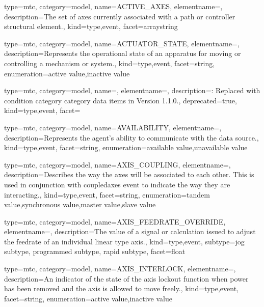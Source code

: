 {
  type=mtc,
  category=model,
  name={ACTIVE\_AXES},
  elementname=,
  description={The set of axes currently associated with a \gls{path} or \gls{controller} \gls{structural element}.},
  kind={type,event},
  facet={\gls{arraystring}}
}


{
  type=mtc,
  category=model,
  name={ACTUATOR\_STATE},
  elementname=,
  description={Represents the operational state of an apparatus for moving or controlling a mechanism or system.},
  kind={type,event},
  facet={\gls{string}},
  enumeration={\gls{active value},\gls{inactive value}}
}


{
  type=mtc,
  category=model,
  name=,
  elementname=,
  description={\DEPRECATED: Replaced with \gls{condition category} category data items in Version 1.1.0.},
  deprecated={true},
  kind={type,event},
  facet={}
}


{
  type=mtc,
  category=model,
  name={AVAILABILITY},
  elementname=,
  description={Represents the \gls{agent}'s ability to communicate with the data source.},
  kind={type,event},
  facet={\gls{string}},
  enumeration={\gls{available value},\gls{unavailable value}}
}


{
  type=mtc,
  category=model,
  name={AXIS\_COUPLING},
  elementname=,
  description={Describes the way the axes will be associated to each other. This is used in conjunction with \gls{coupledaxes event} to indicate the way they are interacting.},
  kind={type,event},
  facet={\gls{string}},
  enumeration={\gls{tandem value},\gls{synchronous value},\gls{master value},\gls{slave value}}
}


{
  type=mtc,
  category=model,
  name={AXIS\_FEEDRATE\_OVERRIDE},
  elementname=,
  description={The value of a signal or calculation issued to adjust the feedrate of an individual linear type axis.},
  kind={type,event},
  subtype={\gls{jog subtype}, \gls{programmed subtype}, \gls{rapid subtype}},
  facet={\gls{float}}
}



{
  type=mtc,
  category=model,
  name={AXIS\_INTERLOCK},
  elementname=,
  description={An indicator of the state of the axis lockout function when power has been removed and the axis is allowed to move freely.},
  kind={type,event},
  facet={\gls{string}},
  enumeration={\gls{active value},\gls{inactive value}}
}


